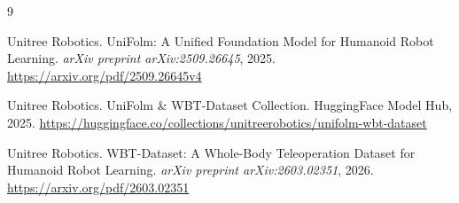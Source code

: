 \documentclass[12pt, a4paper]{article}
\begin{document}
\begin{thebibliography}{9}

Unitree Robotics.
\newblock UniFolm: A Unified Foundation Model for Humanoid Robot Learning.
\newblock \textit{arXiv preprint arXiv:2509.26645}, 2025.
\newblock \url{https://arxiv.org/pdf/2509.26645v4}

Unitree Robotics.
\newblock UniFolm \& WBT-Dataset Collection.
\newblock HuggingFace Model Hub, 2025.
\newblock \url{https://huggingface.co/collections/unitreerobotics/unifolm-wbt-dataset}

Unitree Robotics.
\newblock WBT-Dataset: A Whole-Body Teleoperation Dataset for Humanoid Robot Learning.
\newblock \textit{arXiv preprint arXiv:2603.02351}, 2026.
\newblock \url{https://arxiv.org/pdf/2603.02351}

\end{thebibliography}
\end{document}
